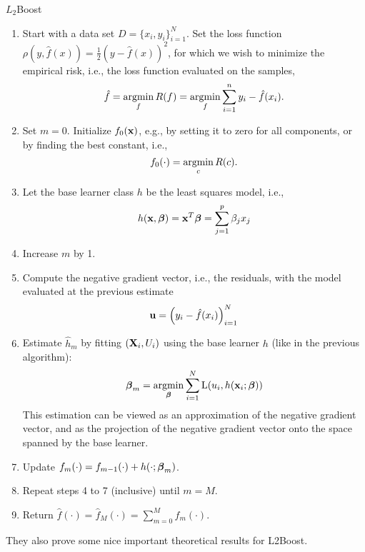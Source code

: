 \begin{algorithm}
\caption{$L_2$Boost}
\label{algo:L2}
\begin{enumerate}
    \item Start with a data set $D=\{x_i, y_i\}_{i=1}^N$. Set the loss function $\rho(y,\hat{f}(x))=\frac{1}{2}(y-\hat{f}(x))^2$, for which we wish to
        minimize the empirical risk, i.e., the loss function evaluated on the samples,
        \begin{equation}
            \hat{f}=\operatorname*{argmin}_{f}R(f)=\operatorname*{argmin}_{f}\sum_{i=1}^n y_i-\hat{f}(x_i).
        \end{equation}
    \item Set $m=0$. Initialize $f_0(\mathbf{x})$, e.g., by setting it to zero for all components, or by finding the best constant, i.e.,
        \begin{equation}
            f_0(\cdot)=\operatorname*{argmin}_c R(c).
        \end{equation}
    \item Let the base learner class $h$ be the least squares model, i.e.,
        \begin{equation}
            h(\mathbf{x}, \boldsymbol{\beta})=\mathbf{x}^T\boldsymbol{\beta}=\sum_{j=1}^p\beta_jx_j
        \end{equation}
    \item Increase $m$ by 1.
    \item Compute the negative gradient vector, i.e., the residuals, with the model evaluated at the previous estimate
        \begin{equation}
            \mathbf{u}=\left(y_i-\hat{f}(x_i)\right)_{i=1}^N
        \end{equation}
    \item Estimate $\hat{h}_m$ by fitting $(\mathbf{X}_i,U_i)$ using the base learner $h$ (like in the previous algorithm):
        \begin{equation*}
            \boldsymbol{\beta}_m=\operatorname*{argmin}_{\boldsymbol{\beta}}\sum_{i=1}^N\operatorname{L}(u_i,h(\mathbf{x}_i;\boldsymbol{\beta}))
        \end{equation*}
        This estimation can be viewed as an approximation of the negative gradient vector, and as the projection of the negative gradient vector onto the space spanned by the base learner.
    \item Update $f_m(\cdot)=f_{m-1}(\cdot)+h(\cdot;\boldsymbol{\beta}_m)$.
    \item Repeat steps 4 to 7 (inclusive) until $m=M$.
    \item Return $\hat{f}(\cdot)=\hat{f}_M(\cdot)=\sum_{m=0}^Mf_m(\cdot)$.
\end{enumerate}
\end{algorithm}
They also prove some nice important theoretical results for L2Boost.
